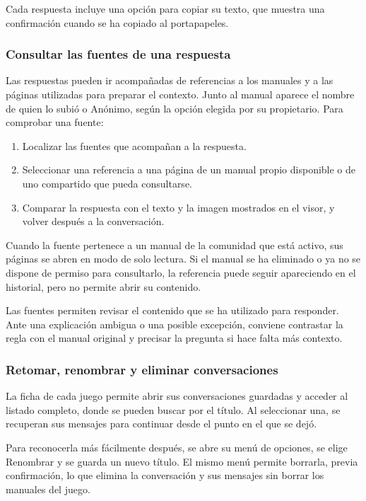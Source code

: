Cada respuesta incluye una opción para copiar su texto, que muestra una
confirmación cuando se ha copiado al portapapeles.

\subsubsection{Consultar las fuentes de una respuesta}
\label{sec:e-fuentes}

Las respuestas pueden ir acompañadas de referencias a los manuales y a las
páginas utilizadas para preparar el contexto. Junto al manual aparece el
nombre de quien lo subió o \guillemotleft{}Anónimo\guillemotright{}, según
la opción elegida por su propietario. Para comprobar una fuente:

\begin{enumerate}
    \item Localizar las fuentes que acompañan a la respuesta.
    \item Seleccionar una referencia a una página de un manual propio
    disponible o de uno compartido que pueda consultarse.
    \item Comparar la respuesta con el texto y la imagen mostrados en el
    visor, y volver después a la conversación.
\end{enumerate}

Cuando la fuente pertenece a un manual de la comunidad que está activo,
sus páginas se abren en modo de solo lectura. Si el manual se ha eliminado
o ya no se dispone de permiso para consultarlo, la referencia puede seguir
apareciendo en el historial, pero no permite abrir su contenido.

Las fuentes permiten revisar el contenido que se ha utilizado para
responder. Ante una explicación ambigua o una posible excepción, conviene
contrastar la regla con el manual original y precisar la pregunta si hace
falta más contexto.

\subsubsection{Retomar, renombrar y eliminar conversaciones}

La ficha de cada juego permite abrir sus conversaciones guardadas y acceder
al listado completo, donde se pueden buscar por el título. Al seleccionar
una, se recuperan sus mensajes para continuar desde el punto en el que se
dejó.

Para reconocerla más fácilmente después, se abre su menú de opciones, se
elige \guillemotleft{}Renombrar\guillemotright{} y se guarda un nuevo
título. El mismo menú permite borrarla, previa confirmación, lo que elimina
la conversación y sus mensajes sin borrar los manuales del juego.

